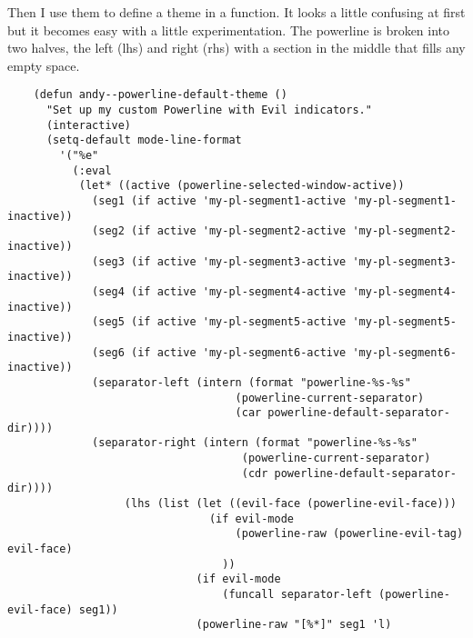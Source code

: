 \documentclass{article}
\begin{document}
Then I use them to define a theme in a function. It looks a little confusing at first but it becomes easy with a little experimentation. The powerline is broken into two halves, the left (lhs) and right (rhs) with a section in the middle that fills any empty space.

\begin{verbatim}
    (defun andy--powerline-default-theme ()
      "Set up my custom Powerline with Evil indicators."
      (interactive)
      (setq-default mode-line-format
        '("%e"
          (:eval
           (let* ((active (powerline-selected-window-active))
             (seg1 (if active 'my-pl-segment1-active 'my-pl-segment1-inactive))
             (seg2 (if active 'my-pl-segment2-active 'my-pl-segment2-inactive))
             (seg3 (if active 'my-pl-segment3-active 'my-pl-segment3-inactive))
             (seg4 (if active 'my-pl-segment4-active 'my-pl-segment4-inactive))
             (seg5 (if active 'my-pl-segment5-active 'my-pl-segment5-inactive))
             (seg6 (if active 'my-pl-segment6-active 'my-pl-segment6-inactive))
             (separator-left (intern (format "powerline-%s-%s"
                                   (powerline-current-separator)
                                   (car powerline-default-separator-dir))))
             (separator-right (intern (format "powerline-%s-%s"
                                    (powerline-current-separator)
                                    (cdr powerline-default-separator-dir))))
                  (lhs (list (let ((evil-face (powerline-evil-face)))
                               (if evil-mode
                                   (powerline-raw (powerline-evil-tag) evil-face)
                                 ))
                             (if evil-mode
                                 (funcall separator-left (powerline-evil-face) seg1))
                             (powerline-raw "[%*]" seg1 'l)


\end{verbatim}
\end{document}
